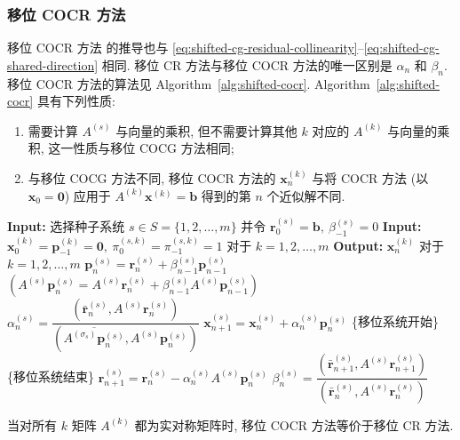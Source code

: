 \subsubsection{{移位 COCR 方法}}\label{subsec:shifted-cocr}\label{srcpage:printed-174}
{移位 COCR 方法  的推导也与 \eqref{eq:shifted-cg-residual-collinearity}--\eqref{eq:shifted-cg-shared-direction} 相同. 移位 CR 方法与移位 COCR 方法的唯一区别是 $\alpha_n$ 和 $\beta_n$. 移位 COCR 方法的算法见 Algorithm\ \ref{alg:shifted-cocr}.}
{Algorithm\ \ref{alg:shifted-cocr} 具有下列性质:}
\begin{enumerate}
\item {需要计算 $A^{(s)}$ 与向量的乘积, 但不需要计算其他 $k$ 对应的 $A^{(k)}$ 与向量的乘积, 这一性质与移位 COCG 方法相同;}
\item {与移位 COCG 方法不同, 移位 COCR 方法的 $\bm x_n^{(k)}$ 与将 COCR 方法 (以 $\bm x_0=\bm0$) 应用于 $A^{(k)}\bm x^{(k)}=\bm b$ 得到的第 $n$ 个近似解不同.}
\end{enumerate}
\begin{algorithm}[H]\caption{{移位 COCR 方法 (注意: $(\bar{\bm a},\bm b)=\bm a^{\top}\bm b$)}}\label{alg:shifted-cocr}\begin{algorithmic}[1]
\Statex\textbf{Input:} {选择种子系统 $s\in S=\{1,2,\ldots,m\}$ 并令 $\bm r_0^{(s)}=\bm b,\ \beta_{-1}^{(s)}=0$}
\Statex\textbf{Input:} $\bm x_0^{(k)}=\bm p_{-1}^{(k)}=\bm0,\ \pi_0^{(s,k)}=\pi_{-1}^{(s,k)}=1$ {对于} $k=1,2,\ldots,m$
\Statex\textbf{Output:} $\bm x_n^{(k)}$ {对于} $k=1,2,\ldots,m$
\State $\bm p_n^{(s)}=\bm r_n^{(s)}+\beta_{n-1}^{(s)}\bm p_{n-1}^{(s)}$
\State $(A^{(s)}\bm p_n^{(s)}=A^{(s)}\bm r_n^{(s)}+\beta_{n-1}^{(s)}A^{(s)}\bm p_{n-1}^{(s)})$
\State $\alpha_n^{(s)}=\dfrac{(\bar{\bm r}_n^{(s)},A^{(s)}\bm r_n^{(s)})}{(\overline{A^{(\sigma_s)}\bm p_n^{(s)}},A^{(s)}\bm p_n^{(s)})}$
\State $\bm x_{n+1}^{(s)}=\bm x_n^{(s)}+\alpha_n^{(s)}\bm p_n^{(s)}$
\State \{{移位系统开始}\}
\State \{{移位系统结束}\}
\State $\bm r_{n+1}^{(s)}=\bm r_n^{(s)}-\alpha_n^{(s)}A^{(s)}\bm p_n^{(s)}$
\State $\beta_n^{(s)}=\dfrac{(\bar{\bm r}_{n+1}^{(s)},A^{(s)}\bm r_{n+1}^{(s)})}{(\bar{\bm r}_n^{(s)},A^{(s)}\bm r_n^{(s)})}$
\EndFor\end{algorithmic}\end{algorithm}
{当对所有 $k$ 矩阵 $A^{(k)}$ 都为实对称矩阵时, 移位 COCR 方法等价于移位 CR 方法.}
